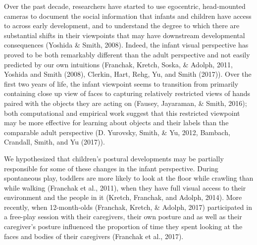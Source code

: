 \documentclass[english,man]{apa6}
\begin{document}
Over the past decade, researchers have started to use egocentric,
head-mounted cameras to document the social information that infants and
children have access to across early development, and to understand the
degree to which there are substantial shifts in their viewpoints that
may have downstream developmental consequences (Yoshida \& Smith, 2008).
Indeed, the infant visual perspective has proved to be both remarkably
different than the adult perspective and not easily predicted by our own
intuitions (Franchak, Kretch, Soska, \& Adolph, 2011, Yoshida and Smith
(2008), Clerkin, Hart, Rehg, Yu, and Smith (2017)). Over the first two
years of life, the infant viewpoint seems to transition from primarily
containing close up view of faces to capturing relatively restricted
views of hands paired with the objects they are acting on (Fausey,
Jayaraman, \& Smith, 2016); both computational and empirical work
suggest that this restricted viewpoint may be more effective for
learning about objects and their labels than the comparable adult
perspective (D. Yurovsky, Smith, \& Yu, 2012, Bambach, Crandall, Smith,
and Yu (2017)).

We hypothesized that children's postural developments may be partially
responsible for some of these changes in the infant perspective. During
spontaneous play, toddlers are more likely to look at the floor while
crawling than while walking (Franchak et al., 2011), when they have full
visual access to their environment and the people in it (Kretch,
Franchak, and Adolph, 2014). More recently, when 12-month-olds
(Franchak, Kretch, \& Adolph, 2017) participated in a free-play session
with their caregivers, their own posture and as well as their
caregiver's posture influenced the proportion of time they spent looking
at the faces and bodies of their caregivers (Franchak et al., 2017).
\end{document}

